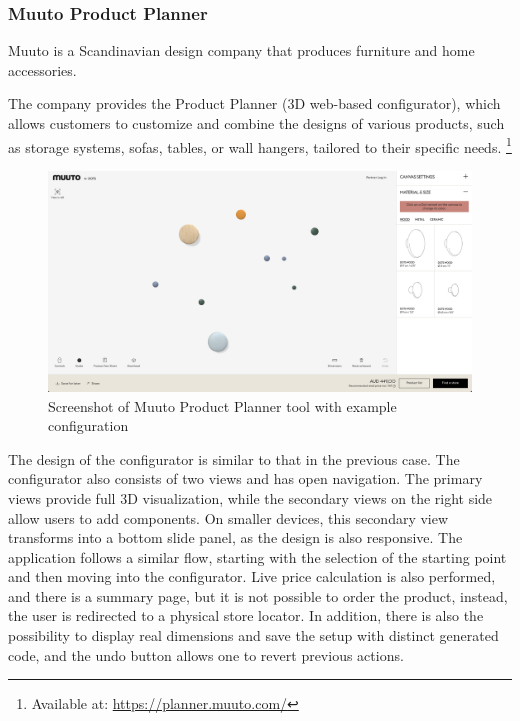 \subsubsection{Muuto Product Planner}

Muuto is a Scandinavian design company that produces furniture and home accessories. \cite{Muuto}

The company provides the Product Planner (3D web-based configurator), which allows customers to customize and combine the designs of various products, such as storage systems, sofas, tables, or wall hangers, tailored to their specific needs. \footnote{Available at: \url{https://planner.muuto.com/}}

\begin{figure}[h]
\centering
\includegraphics[width=14cm]{images/analysis_muuto-product-planner.png}
\caption{Screenshot of Muuto Product Planner tool with example configuration}
\end{figure}

The design of the configurator is similar to that in the previous case. The configurator also consists of two views and has open navigation. The primary views provide full 3D visualization, while the secondary views on the right side allow users to add components. On smaller devices, this secondary view transforms into a bottom slide panel, as the design is also responsive. The application follows a similar flow, starting with the selection of the starting point and then moving into the configurator. Live price calculation is also performed, and there is a summary page, but it is not possible to order the product, instead, the user is redirected to a physical store locator. In addition, there is also the possibility to display real dimensions and save the setup with distinct generated code, and the undo button allows one to revert previous actions.

